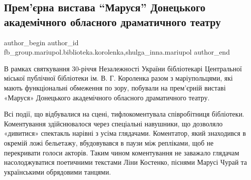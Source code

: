  
 
 
 
 

\subsection{Прем'єрна вистава \enquote{Маруся} Донецького академічного обласного драматичного театру}
\label{sec:25_08_2021.fb.fb_group.mariupol.biblioteka.korolenka.1.prem_rna_vistava__m}
 
\ifcmt
 author_begin
   author_id fb_group.mariupol.biblioteka.korolenka,shulga_inna.mariupol
 author_end
\fi

В рамках святкування 30-річчя Незалежності України бібліотекарі Центральної
міської публічної бібліотеки ім. В. Г. Короленка разом з маріупольцями, які
мають функціональні обмеження по зору, побували на прем'єрній виставі «Маруся»
Донецького академічного обласного драматичного театру. 

Всі події, що відбувалися на сцені, тифлокоментувала співробітниця бібліотеки.
Коментування здійснювалося через спеціальні навушники, що дозволяло «дивитися»
спектакль нарівні з усіма глядачами. Коментатор, який знаходився в окремій ложі
бельетажу, вбудовувався в паузи між репліками, щоб не перекривати голоси
акторів. Таким чином коментування не заважало глядачам насолоджуватися
поетичними текстами Ліни Костенко, піснями Марусі Чурай та українськими
обрядовими танцями.
